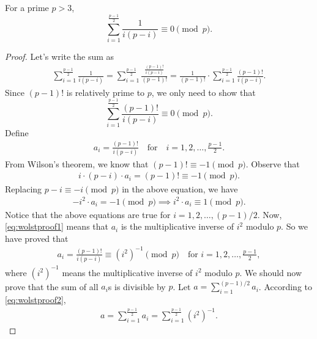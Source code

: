 \documentclass[12pt]{subfile}
\begin{document}
		\begin{lemma}\label{lem:wolstproof4}
			For a prime $p>3$,
			$$\displaystyle\sum_{i=1}^{\frac{p-1}{2}} \frac{1}{i(p-i)} \equiv 0 \pmod p.$$
		\end{lemma}
	
		\begin{proof}
			Let's write the sum as
				\begin{align*}
					\sum_{i=1}^{\frac{p-1}{2}} \frac{1}{i(p-i)} = \sum_{i=1}^{\frac{p-1}{2}} \frac{\frac{(p-1)!}{i(p-i)}}{(p-1)!} = \frac{1}{(p-1)!} \cdot \sum_{i=1}^{\frac{p-1}{2}} \frac{(p-1)!}{i(p-i)}.
				\end{align*}
			Since $(p-1)!$ is relatively prime to $p$, we only need to show that $$\displaystyle \sum_{i=1}^{\frac{p-1}{2}} \frac{(p-1)!}{i(p-i)} \equiv 0 \pmod p.$$
			Define
				\begin{align*}
					a_i = \frac{(p-1)!}{i(p-i)} \quad \text{for} \quad i=1,2,\ldots,\frac{p-1}{2}.
				\end{align*}
			From Wilson's theorem, we know that $(p-1)! \equiv -1 \pmod p$. Observe that
				\begin{align*}
					i\cdot (p-i) \cdot a_i = (p-1)! \equiv -1 \pmod p.
				\end{align*}
			Replacing $p-i \equiv -i \pmod p$ in the above equation, we have
				\begin{align}\label{eq:wolstproof1}
					-i^2 \cdot a_i = -1 \pmod p \implies i^2 \cdot a_i \equiv 1 \pmod p.
				\end{align}
			Notice that the above equations are true for $i=1,2,\ldots,(p-1)/2$. Now, \eqref{eq:wolstproof1} means that $a_i$ is the multiplicative inverse of $i^2$ modulo $p$. So we have proved that
				\begin{align}\label{eq:wolstproof2}
					a_i = \frac{(p-1)!}{i(p-i)} \equiv (i^2)^{-1} \pmod p\quad \text{for } i=1,2,\ldots,\frac{p-1}{2},
				\end{align}
			where $(i^2)^{-1}$ means the multiplicative inverse of $i^2$ modulo $p$. We should now prove that the sum of all $a_i$s is divisible by $p$. Let $\displaystyle a= \sum_{i=1}^{(p-1)/2} a_i$. According to \eqref{eq:wolstproof2},
				\begin{align*}
					a= \sum_{i=1}^{\frac{p-1}{2}} a_i = \sum_{i=1}^{\frac{p-1}{2}} (i^2)^{-1}.

\end{align*}
\end{proof}
\end{document}
